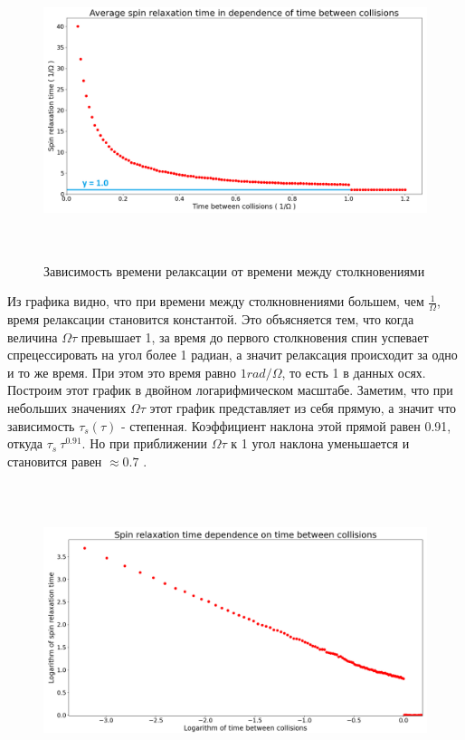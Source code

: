 \documentclass[12pt,oneside]{book}
\begin{document}
{{	\begin{figure}[h!]
		\centering
		\includegraphics[width = 16cm, height = 8.65cm]{img/T_5000_117_from0,04to1,2.png}
		\caption{Зависимость времени релаксации от времени между столкновениями}
		\label{fig:f3}
	\end{figure} 
	Из графика видно, что при времени между столкновнениями большем, чем $\frac{1}{\Omega}$, время релаксации становится константой. Это объясняется тем, что когда величина ${\Omega}{\tau}$ превышает 1, за время до первого столкновения спин успевает спрецессировать на угол более 1 радиан, а значит релаксация происходит за одно и то же время. При этом это время равно  ${1 rad/\Omega}$, то есть 1 в данных осях.
	\newline
	Построим этот график в двойном логарифмическом масштабе. Заметим, что при небольших значениях  ${\Omega}{\tau}$ этот график представляет из себя прямую, а значит что зависимость  $\tau_s(\tau)$ - степенная. Коэффициент наклона этой прямой равен 0.91, откуда  $\tau_s ~ \tau^0.91$. Но при приближении ${\Omega}{\tau}$ к 1 угол наклона уменьшается и становится равен $\approx 0.7$ .
	\begin{figure}[h!]
		\centering
		\includegraphics[width = 16cm, height = 8.57cm]{img/LL_5000_117_from0,04to1,2.png}

\end{figure}}}
\end{document}

